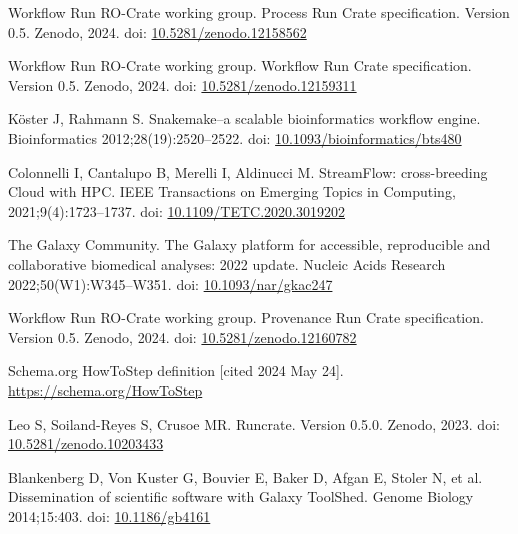 \documentclass[10pt,letterpaper]{article}
\begin{document}
\begin{thebibliography}{10}
\begin{small}
Workflow Run RO-Crate working group.
Process Run Crate specification. Version 0.5.
Zenodo, 2024.
doi: \href{https://doi.org/10.5281/zenodo.12158562}{10.5281/zenodo.12158562}


Workflow Run RO-Crate working group.
Workflow Run Crate specification. Version 0.5.
Zenodo, 2024.
doi: \href{https://doi.org/10.5281/zenodo.12159311}{10.5281/zenodo.12159311}

Köster J, Rahmann S.
Snakemake--a scalable bioinformatics workflow engine.
Bioinformatics 2012;28(19):2520--2522.
doi: \href{https://doi.org/10.1093/bioinformatics/bts480}{10.1093/bioinformatics/bts480}

Colonnelli I, Cantalupo B, Merelli I, Aldinucci M.
StreamFlow: cross-breeding Cloud with HPC.
IEEE Transactions on Emerging Topics in Computing, 2021;9(4):1723--1737.
doi: \href{https://doi.org/10.1109/TETC.2020.3019202}{10.1109/TETC.2020.3019202}

The Galaxy Community.
The Galaxy platform for accessible, reproducible and collaborative biomedical analyses: 2022 update.
Nucleic Acids Research 2022;50(W1):W345--W351.
doi: \href{https://doi.org/10.1093/nar/gkac247}{10.1093/nar/gkac247}

Workflow Run RO-Crate working group.
Provenance Run Crate specification. Version 0.5.
Zenodo, 2024.
doi: \href{https://doi.org/10.5281/zenodo.12160782}{10.5281/zenodo.12160782}

Schema.org HowToStep definition [cited 2024 May 24].
\url{https://schema.org/HowToStep}

Leo S, Soiland-Reyes S, Crusoe MR.
Runcrate. Version 0.5.0.
Zenodo, 2023.
doi: \href{https://doi.org/10.5281/zenodo.10203433}{10.5281/zenodo.10203433}

Blankenberg D, Von Kuster G, Bouvier E, Baker D, Afgan E, Stoler N, et al.
Dissemination of scientific software with Galaxy ToolShed.
Genome Biology 2014;15:403.
doi: \href{https://doi.org/10.1186/gb4161}{10.1186/gb4161}


\end{small}
\end{thebibliography}
\end{document}

